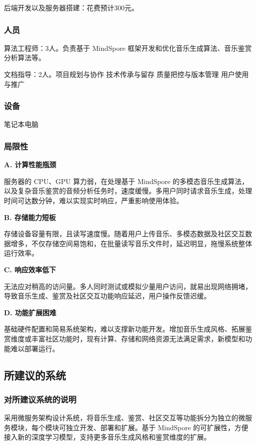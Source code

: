 \documentclass{base}
\begin{document}
后端开发以及服务器搭建：花费预计300元。

\subsubsection{人员}

算法工程师：3人。负责基于 MindSpore 框架开发和优化音乐生成算法、音乐鉴赏分析算法等。

文档指导：2人。项目规划与协作 技术传承与留存 质量把控与版本管理 用户使用与推广

\subsubsection{设备}

笔记本电脑

\subsubsection{局限性}

\textbf{A. 计算性能瓶颈​}

服务器的 CPU、GPU 算力弱，在处理基于 MindSpore 的多模态音乐生成算法，以及复杂音乐鉴赏的音频分析任务时，速度缓慢。多用户同时请求音乐生成，处理时间可达数分钟，难以实现实时响应，严重影响使用体验。​

\textbf{B. 存储能力短板​}

存储设备容量有限，且读写速度慢。随着用户上传音乐、多模态数据及社区交互数据增多，不仅存储空间易饱和，在批量读写音乐文件时，延迟明显，拖慢系统整体运行效率。

\textbf{C. 响应效率低下​}

无法应对稍高的访问量。多人同时测试或模拟少量用户访问，就易出现网络拥堵，导致音乐生成、鉴赏及社区交互功能响应延迟，用户操作反馈迟缓。​

\textbf{D. 功能扩展困难​}

基础硬件配置和简易系统架构，难以支撑新功能开发。增加音乐生成风格、拓展鉴赏维度或丰富社区功能时，现有计算、存储和网络资源无法满足需求，新模型和功能难以部署运行。

\subsection{所建议的系统}

\subsubsection{对所建议系统的说明}

采用微服务架构设计系统，将音乐生成、鉴赏、社区交互等功能拆分为独立的微服务模块，每个模块可独立开发、部署和扩展。基于 MindSpore 的可扩展性，方便接入新的深度学习模型，支持更多音乐生成风格和鉴赏维度的扩展。​
\end{document}
